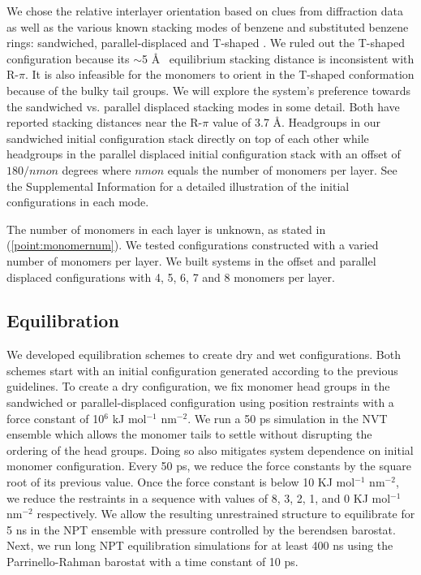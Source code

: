 \documentclass[journal=jpcbfk,manusciprt=article]{achemso}
\begin{document}

  We chose the relative interlayer orientation based on clues from diffraction
  data as well as the various known stacking modes of benzene and substituted
  benzene rings: sandwiched, parallel-displaced and T-shaped
  \cite{sinnokrot_estimates_2002}. We ruled out the T-shaped configuration
  because its $\sim$5 \AA~ equilibrium stacking distance
  \cite{sinnokrot_estimates_2002} is inconsistent with R-$\pi$. It is also
  infeasible for the monomers to orient in the T-shaped conformation because of
  the bulky tail groups. We will explore the system's preference towards the
  sandwiched vs. parallel displaced stacking modes in some detail. Both have
  reported stacking distances near the R-$\pi$ value of 3.7 \AA. Headgroups in
  our sandwiched initial configuration stack directly on top of each other while
  headgroups in the parallel displaced initial configuration stack with an offset
  of $180/nmon$ degrees where $nmon$ equals the number of monomers per layer. See
  the Supplemental Information for a detailed illustration of the initial
  configurations in each mode.

  The number of monomers in each layer is unknown, as stated in
  (\ref{point:monomernum}). We tested configurations constructed with a varied
  number of monomers per layer. We built systems in the offset and parallel
  displaced configurations with 4, 5, 6, 7 and 8 monomers per layer.

  \subsection{Equilibration}

  We developed equilibration schemes to create dry and wet configurations. Both
  schemes start with an initial configuration generated according to the previous
  guidelines. To create a dry configuration, we fix monomer head groups in the
  sandwiched or parallel-displaced configuration using position restraints with a
  force constant of 10$^6$ kJ mol$^{-1}$ nm$^{-2}$. We run a 50 ps simulation in
  the NVT ensemble which allows the monomer tails to settle without disrupting
  the ordering of the head groups. Doing so also mitigates system dependence on
  initial monomer configuration. Every 50 ps, we reduce the force constants by
  the square root of its previous value. Once the force constant is below 10 KJ
  mol$^{-1}$ nm$^{-2}$, we reduce the restraints in a sequence with values of
  8, 3, 2, 1, and 0 KJ mol$^{-1}$ nm$^{-2}$ respectively. We allow the resulting
  unrestrained structure to equilibrate for 5 ns in the NPT ensemble
  with pressure controlled by the berendsen barostat. Next, we run long NPT
  equilibration simulations for at least 400 ns using the Parrinello-Rahman
  barostat with a time constant of 10 ps.
\end{document}
